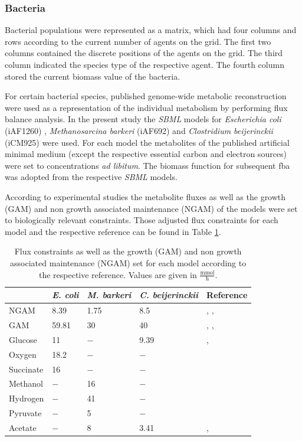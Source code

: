 \subsubsection{Bacteria}
Bacterial populations were represented as a matrix, which had four columns and rows according to the current number of agents on the grid. The first two columns contained the discrete positions of the agents on the grid. The third column indicated the species type of the respective agent. The fourth column stored the current biomass value of the bacteria.

For certain bacterial species, published genome-wide metabolic reconstruction were used as a representation of the individual metabolism by performing flux balance analysis. In the present study the \textit{SBML} models for \emph{Escherichia coli} (iAF1260) \cite{Feist07}, \emph{Methanosarcina barkeri} (iAF692) \cite{Feist06} and \emph{Clostridium beijerinckii} (iCM925) \cite{Milne11} were used. For each model the metabolites of the published artificial minimal medium (except the respective essential carbon and electron sources) were set to concentrations \emph{ad libitum}. The biomass function for subsequent fba was adopted from the respective \textit{SBML} models. 

According to experimental studies the metabolite fluxes as well as the growth (GAM) and non growth associated maintenance (NGAM) of the models were set to biologically relevant constraints. Those adjusted flux constraints for each model and the respective reference can be found in Table \hyperref[ab:const]{\ref{tab:const}}.

\begin{table}[h!]\centering\footnotesize
\caption{Flux constraints as well as the growth (GAM) and non growth associated maintenance (NGAM) set for each model according to the respective reference. Values are given in $\frac{\mathrm{mmol}}{\mathrm{h}}$.}
\begin{tabular}{lllll}
\toprule
 & \emph{E. coli} & \emph{M. barkeri} & \emph{C. beijerinckii} & Reference\\
\midrule
NGAM & 8.39 & 1.75 & 8.5 & \cite{Feist07}, \cite{Feist06}, \cite{Milne11}\\
GAM & 59.81 & 30 & 40 & \cite{Feist07}, \cite{Feist06}, \cite{Milne11}\\
Glucose & 11 & $-$ & 9.39 & \cite{Feist07}, \cite{Milne11}\\
Oxygen & 18.2 & $-$ & $-$ & \cite{Feist07}\\
Succinate & 16 & $-$ & $-$ & \cite{Orth11}\\
Methanol & $-$ & 16 & $-$ & \cite{Feist06}\\
Hydrogen & $-$ & 41 & $-$ & \cite{Feist06}\\
Pyruvate & $-$ & 5 & $-$ & \cite{Feist06}\\
Acetate & $-$ & 8 & 3.41 & \cite{Feist06}, \cite{Milne11}\\
\bottomrule 
\end{tabular} 
\label{tab:const}
\end{table}

